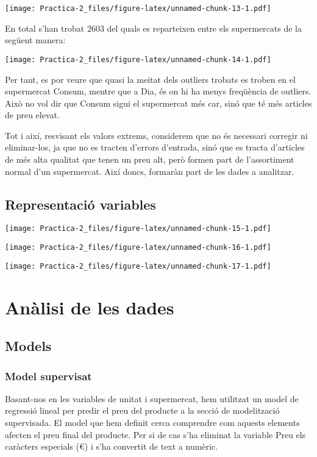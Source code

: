\documentclass[
]{article}
\begin{document}
\texttt{[image: Practica-2\_files/figure-latex/unnamed-chunk-13-1.pdf]}

En total s'han trobat 2603 del quals es reparteixen entre els
supermercats de la següent manera:

\texttt{[image: Practica-2\_files/figure-latex/unnamed-chunk-14-1.pdf]}

Per tant, es por veure que quasi la meitat dels outliers trobats es
troben en el supermercat Consum, mentre que a Dia, és on hi ha menys
freqüència de outliers. Això no vol dir que Consum sigui el supermercat
més car, sinó que té més articles de preu elevat.

Tot i així, resvisant els valors extrems, considerem que no és necessari
corregir ni eliminar-los, ja que no es tracten d'errors d'entrada, sinó
que es tracta d'articles de més alta qualitat que tenen un preu alt,
però formen part de l'assortiment normal d'un supermercat. Així doncs,
formaràn part de les dades a analitzar.

\hypertarget{representaciuxf3-variables}{%
\subsection{Representació variables}\label{representaciuxf3-variables}}

\texttt{[image: Practica-2\_files/figure-latex/unnamed-chunk-15-1.pdf]}

\texttt{[image: Practica-2\_files/figure-latex/unnamed-chunk-16-1.pdf]}

\texttt{[image: Practica-2\_files/figure-latex/unnamed-chunk-17-1.pdf]}

\hypertarget{anuxe0lisi-de-les-dades}{%
\section{Anàlisi de les dades}\label{anuxe0lisi-de-les-dades}}

\hypertarget{models}{%
\subsection{Models}\label{models}}

\hypertarget{model-supervisat}{%
\subsubsection{Model supervisat}\label{model-supervisat}}

Basant-nos en les variables de unitat i supermercat, hem utilitzat un
model de regressió lineal per predir el preu del producte a la secció de
modelització supervisada. El model que hem definit cerca comprendre com
aquests elements afecten el preu final del producte. Per si de cas s'ha
eliminat la variable Preu els caràcters especials (€) i s'ha convertit
de text a numèric.
\end{document}
